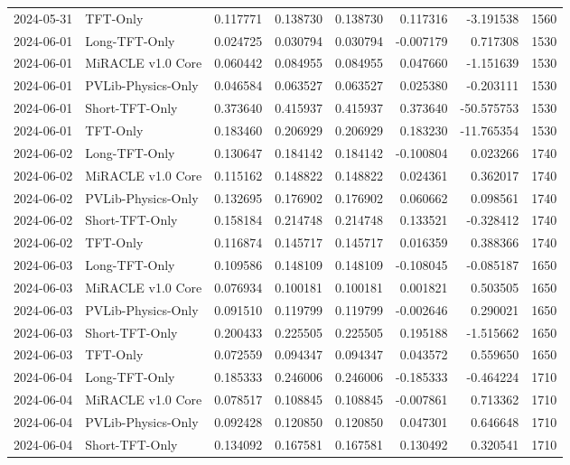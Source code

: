 \begin{tabular}{llrrrrrr}
2024-05-31 & TFT-Only & 0.117771 & 0.138730 & 0.138730 & 0.117316 & -3.191538 & 1560 \\
2024-06-01 & Long-TFT-Only & 0.024725 & 0.030794 & 0.030794 & -0.007179 & 0.717308 & 1530 \\
2024-06-01 & MiRACLE v1.0 Core & 0.060442 & 0.084955 & 0.084955 & 0.047660 & -1.151639 & 1530 \\
2024-06-01 & PVLib-Physics-Only & 0.046584 & 0.063527 & 0.063527 & 0.025380 & -0.203111 & 1530 \\
2024-06-01 & Short-TFT-Only & 0.373640 & 0.415937 & 0.415937 & 0.373640 & -50.575753 & 1530 \\
2024-06-01 & TFT-Only & 0.183460 & 0.206929 & 0.206929 & 0.183230 & -11.765354 & 1530 \\
2024-06-02 & Long-TFT-Only & 0.130647 & 0.184142 & 0.184142 & -0.100804 & 0.023266 & 1740 \\
2024-06-02 & MiRACLE v1.0 Core & 0.115162 & 0.148822 & 0.148822 & 0.024361 & 0.362017 & 1740 \\
2024-06-02 & PVLib-Physics-Only & 0.132695 & 0.176902 & 0.176902 & 0.060662 & 0.098561 & 1740 \\
2024-06-02 & Short-TFT-Only & 0.158184 & 0.214748 & 0.214748 & 0.133521 & -0.328412 & 1740 \\
2024-06-02 & TFT-Only & 0.116874 & 0.145717 & 0.145717 & 0.016359 & 0.388366 & 1740 \\
2024-06-03 & Long-TFT-Only & 0.109586 & 0.148109 & 0.148109 & -0.108045 & -0.085187 & 1650 \\
2024-06-03 & MiRACLE v1.0 Core & 0.076934 & 0.100181 & 0.100181 & 0.001821 & 0.503505 & 1650 \\
2024-06-03 & PVLib-Physics-Only & 0.091510 & 0.119799 & 0.119799 & -0.002646 & 0.290021 & 1650 \\
2024-06-03 & Short-TFT-Only & 0.200433 & 0.225505 & 0.225505 & 0.195188 & -1.515662 & 1650 \\
2024-06-03 & TFT-Only & 0.072559 & 0.094347 & 0.094347 & 0.043572 & 0.559650 & 1650 \\
2024-06-04 & Long-TFT-Only & 0.185333 & 0.246006 & 0.246006 & -0.185333 & -0.464224 & 1710 \\
2024-06-04 & MiRACLE v1.0 Core & 0.078517 & 0.108845 & 0.108845 & -0.007861 & 0.713362 & 1710 \\
2024-06-04 & PVLib-Physics-Only & 0.092428 & 0.120850 & 0.120850 & 0.047301 & 0.646648 & 1710 \\
2024-06-04 & Short-TFT-Only & 0.134092 & 0.167581 & 0.167581 & 0.130492 & 0.320541 & 1710 \\

\end{tabular}
